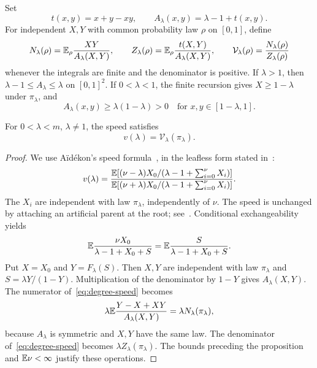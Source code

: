 Set
\begin{equation}\label{eq:kernels}
 t(x,y)=x+y-xy,\qquad A_\lambda(x,y)=\lambda-1+t(x,y).
\end{equation}
For independent $X,Y$ with common probability law $\rho$ on $[0,1]$, define
\begin{equation}\label{eq:NZ}
 N_\lambda(\rho)=\mathbb E_\rho\frac{XY}{A_\lambda(X,Y)},\qquad
 Z_\lambda(\rho)=\mathbb E_\rho\frac{t(X,Y)}{A_\lambda(X,Y)},\qquad
 \mathcal V_\lambda(\rho)=\frac{N_\lambda(\rho)}{Z_\lambda(\rho)}
\end{equation}
whenever the integrals are finite and the denominator is positive. If $\lambda>1$, then $\lambda-1\le A_\lambda\le\lambda$ on $[0,1]^2$. If $0<\lambda<1$, the finite recursion gives $X\ge1-\lambda$ under $\pi_\lambda$, and
\begin{equation}\label{eq:low-denominator}
 A_\lambda(x,y)\ge\lambda(1-\lambda)>0
 \quad\text{for }x,y\in[1-\lambda,1].
\end{equation}

\begin{proposition}\label{prop:symmetric}
For $0<\lambda<m$, $\lambda\ne1$, the speed satisfies
\begin{equation}\label{eq:pair-speed}
 v(\lambda)=\mathcal V_\lambda(\pi_\lambda).
\end{equation}
\end{proposition}

\begin{proof}
We use A\"id\'ekon's speed formula~\cite[Theorem~1.1]{Aidekon}, in the leafless form stated in~\cite[(2.1)]{SWX}:
\begin{equation}\label{eq:degree-speed}
 v(\lambda)=
 \frac{\mathbb E[(\nu-\lambda)X_0/(\lambda-1+\sum_{i=0}^{\nu}X_i)]}
 {\mathbb E[(\nu+\lambda)X_0/(\lambda-1+\sum_{i=0}^{\nu}X_i)]}.
\end{equation}
The $X_i$ are independent with law $\pi_\lambda$, independently of $\nu$. The speed is unchanged by attaching an artificial parent at the root; see~\cite[Lemma~2.1]{SWX}. Conditional exchangeability yields
\begin{equation*}
 \mathbb E\frac{\nu X_0}{\lambda-1+X_0+S}
 =\mathbb E\frac{S}{\lambda-1+X_0+S}.
\end{equation*}
Put $X=X_0$ and $Y=F_\lambda(S)$. Then $X,Y$ are independent with law $\pi_\lambda$ and $S=\lambda Y/(1-Y)$. Multiplication of the denominator by $1-Y$ gives $A_\lambda(X,Y)$. The numerator of~\eqref{eq:degree-speed} becomes
\begin{equation*}
 \lambda\mathbb E\frac{Y-X+XY}{A_\lambda(X,Y)}
 =\lambda N_\lambda(\pi_\lambda),
\end{equation*}
because $A_\lambda$ is symmetric and $X,Y$ have the same law. The denominator of~\eqref{eq:degree-speed} becomes $\lambda Z_\lambda(\pi_\lambda)$. The bounds preceding the proposition and $\mathbb E\nu<\infty$ justify these operations.
\end{proof}

